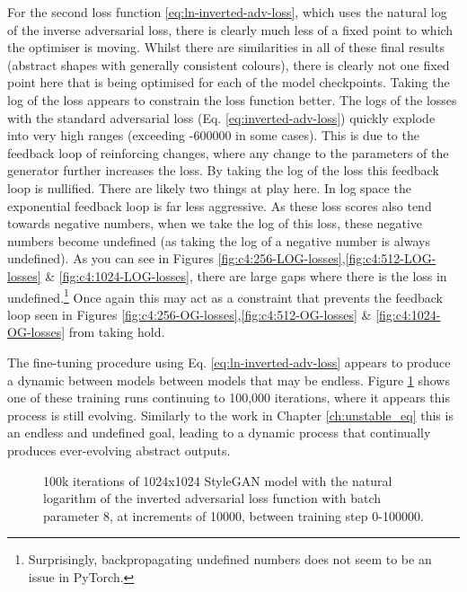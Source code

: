 For the second loss function \ref{eq:ln-inverted-adv-loss}, which uses the natural log of the inverse adversarial loss, there is clearly much less of a fixed point to which the optimiser is moving. 
Whilst there are similarities in all of these final results (abstract shapes with generally consistent colours), there is clearly not one fixed point here that is being optimised for each of the model checkpoints.
Taking the log of the loss appears to constrain the loss function better.
The logs of the losses with the standard adversarial loss (Eq. \ref{eq:inverted-adv-loss}) quickly explode into very high ranges (exceeding -600000 in some cases).
This is due to the feedback loop of reinforcing changes, where any change to the parameters of the generator further increases the loss.
By taking the log of the loss this feedback loop is nullified. 
There are likely two things at play here.
In log space the exponential feedback loop is far less aggressive. 
As these loss scores also tend towards negative numbers, when we take the log of this loss, these negative numbers become undefined (as taking the log of a negative number is always undefined).
As you can see in Figures \ref{fig:c4:256-LOG-losses},\ref{fig:c4:512-LOG-losses} \& \ref{fig:c4:1024-LOG-losses}, there are large gaps where there is the loss in undefined.\footnote{Surprisingly, backpropagating undefined numbers does not seem to be an issue in PyTorch.}
Once again this may act as a constraint that prevents the feedback loop seen in Figures \ref{fig:c4:256-OG-losses},\ref{fig:c4:512-OG-losses} \& \ref{fig:c4:1024-OG-losses} from taking hold.

The fine-tuning procedure using Eq. \ref{eq:ln-inverted-adv-loss} appears to produce a dynamic between models between models that may be endless. 
Figure \ref{fig:c4:100k-iterations} shows one of these training runs continuing to 100,000 iterations, where it appears this process is still evolving.
Similarly to the work in Chapter \ref{ch:unstable_eq} this is an endless and undefined goal, leading to a dynamic process that continually produces ever-evolving abstract outputs.

\begin{figure}[!htbp]
  \centering
  \caption[100k iterations of 1024x1024 StyleGAN model with the natural logarithm of the inverted adversarial loss function]{100k iterations of 1024x1024 StyleGAN model with the natural logarithm of the inverted adversarial loss function with batch parameter 8, at increments of 10000, between training step 0-100000.}
  \label{fig:c4:100k-iterations}
\end{figure}

